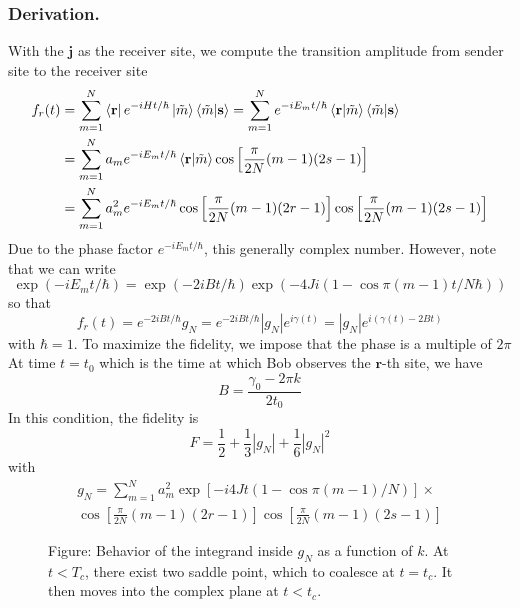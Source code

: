 \documentclass[../../../main.tex]{subfiles}
\begin{document}
\subsubsection{Derivation.}
With the $\mathbf{j}$ as the receiver site, we compute the transition amplitude from sender site to the receiver site
\begin{align*}
    f_r (t)
     & = \sum_{m=1 } ^N  \bra{\mathbf{r}} e ^{-iHt/\hbar } \ket{\tilde{m }} \braket{\tilde{m }  | \mathbf{s}}
    = \sum_{m=1 } ^N  e ^{-iE_mt/\hbar }  \braket{\mathbf{r }  | \tilde{m}} \braket{\tilde{m }  | \mathbf{s}}                                          \\
     & = \sum_{m=1 } ^N  a_m e ^{-iE_m t/\hbar } \braket{\mathbf{r}|\tilde{m }} \cos \left[ \frac{\pi }{2N }(m-1 ) (2s-1) \right]                      \\
     & = \sum_{m=1 } ^N  a_m^2  e ^{-iE_m t/\hbar }\cos \left[ \frac{\pi }{2N }(m-1 ) (2r-1) \right] \cos \left[ \frac{\pi }{2N }(m-1 ) (2s-1) \right]
\end{align*}
Due to the phase factor $e ^{-i E_m t/\hbar}$, this generally complex number.
However, note that we can write
\begin{equation*}
    \exp \left( -i E_m t/\hbar \right) =   \exp(-2iBt/\hbar ) \exp \left( -4Ji (1 - \cos \pi(m-1) t/N \hbar ) \right)
\end{equation*}
so that
\begin{equation*}
    f_r(t) = e ^{-2iBt/\hbar } g_N  = e ^{-2iBt/\hbar } | g_N | e ^{i\gamma(t)} = |g_N| e ^{i(\gamma(t)-2Bt)}
\end{equation*}
with $\hbar = 1$.
To maximize the fidelity, we impose that the phase is a multiple of $2\pi$
At time $t=t_0$ which is the time at which Bob observes the $\mathbf{r}$-th site, we have
\begin{equation*}
    B = \frac{\gamma_0- 2\pi k }{2 t_0}
\end{equation*}
In this condition, the fidelity is
\begin{equation*}
    F = \frac{1 }{2 }+ \frac{1 }{3 }|g_N| + \frac{1 }{6 }|g_N|^2
\end{equation*}
with
\begin{multline*}
    g_N = \sum_{m=1 } ^N  a_m^2 \exp \left[ -i4Jt (1 - \cos \pi(m-1) /N ) \right]  \times\\
    \cos \left[ \frac{\pi }{2N }(m-1 ) (2r-1) \right] \cos \left[ \frac{\pi }{2N }(m-1 ) (2s-1) \right]
\end{multline*}

\begin{figure}[t]
    \centering
    \resizebox{\textwidth}{!}{}
    \caption*{Figure: Behavior of the integrand inside $g_N$ as a function of $k$. At $t < T_c$, there exist two saddle point, which to coalesce at $t = t_c$. It then moves into the complex plane at $t<t_c$.}
\end{figure}
\end{document}
